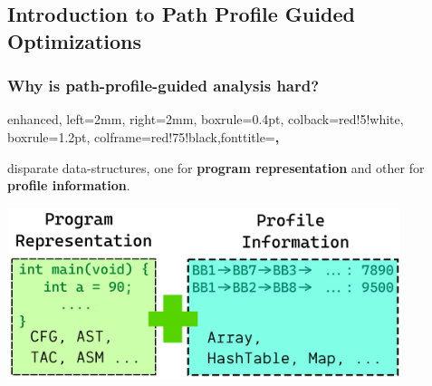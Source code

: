 \documentclass[aspectratio=169, compress]{beamer}
\begin{document}
\subsection{Introduction to Path Profile Guided Optimizations}
{
	
}
\begin{frame}
	\frametitle{Why is path-profile-guided analysis hard?}
	\tcbset
	{
		enhanced,
		left=2mm,
		right=2mm,
		boxrule=0.4pt,
		colback=red!5!white,
		boxrule=1.2pt,
		colframe=red!75!black,fonttitle=\bfseries,
	}
	\begin{tcolorbox}[colback=red!3!white,colframe=red!50!black,lifted shadow={1mm}{-2mm}{3mm}{0.1mm}{black!50!white}]
	disparate data-structures, one for \textbf{program representation} and other for \textbf{profile information}.
	\end{tcolorbox}
	\centering
	\includegraphics[width=11.5cm, height=5cm]{dotfiles/docs.pdf}
\end{frame}
{
	
}
{
	
}
\end{document}
